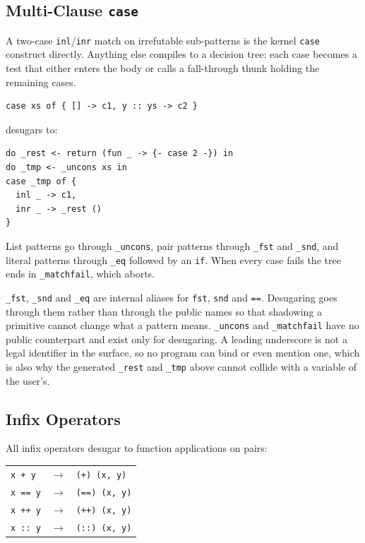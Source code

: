 \documentclass[11pt,a4paper]{article}
\newcommand{\cba}[1]{\lstinline[style=cbainline]{#1}}
\begin{document}
\subsection{Multi-Clause \texttt{case}}

A two-case \cba{inl}/\cba{inr} match on irrefutable sub-patterns is the
kernel \cba{case} construct directly.  Anything else compiles to a decision
tree: each case becomes a test that either enters the body or calls a
fall-through thunk holding the remaining cases.

\begin{lstlisting}
case xs of { [] -> c1, y :: ys -> c2 }
\end{lstlisting}

desugars to:

\begin{lstlisting}
do _rest <- return (fun _ -> {- case 2 -}) in
do _tmp <- _uncons xs in
case _tmp of {
  inl _ -> c1,
  inr _ -> _rest ()
}
\end{lstlisting}

List patterns go through \cba{_uncons}, pair patterns through \cba{_fst} and
\cba{_snd}, and literal patterns through \cba{_eq} followed by an \cba{if}.
When every case fails the tree ends in \cba{_matchfail}, which aborts.

\cba{_fst}, \cba{_snd} and \cba{_eq} are internal aliases for \cba{fst},
\cba{snd} and \cba{==}.  Desugaring goes through them rather than through the
public names so that shadowing a primitive cannot change what a pattern means.
\cba{_uncons} and \cba{_matchfail} have no public counterpart and exist only
for desugaring.  A leading underscore is not a legal identifier in the
surface, so no program can bind or even mention one, which is also why the
generated \cba{_rest} and \cba{_tmp} above cannot collide with a variable of
the user's.

\subsection{Infix Operators}

All infix operators desugar to function applications on pairs:

\begin{center}
\begin{tabular}{lcl}
\texttt{x + y}  & $\longrightarrow$ & \texttt{(+) (x, y)} \\
\texttt{x == y} & $\longrightarrow$ & \texttt{(==) (x, y)} \\
\texttt{x ++ y} & $\longrightarrow$ & \texttt{(++) (x, y)} \\
\texttt{x :: y} & $\longrightarrow$ & \texttt{(::) (x, y)} \\
\end{tabular}
\end{center}
\end{document}
